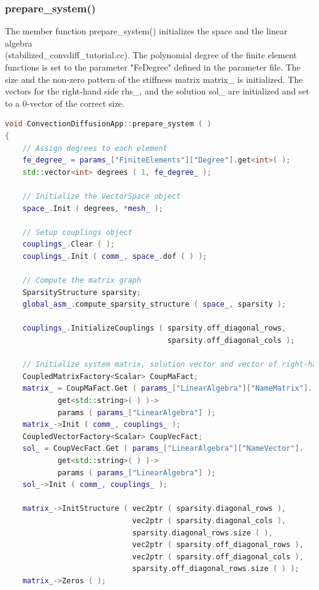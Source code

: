 \documentclass[a4paper, 11pt, twoside]{article}
\begin{document}
\subsubsection{prepare\_system()}\label{sec:prepare}
The member function prepare\_system() initializes the space and the linear algebra \\ (stabilized\_convdiff\_tutorial.cc). The polynomial degree of the finite element functions is set to the parameter "FeDegree" defined in the parameter file. The size and the non-zero pattern of the stiffness matrix matrix\_ is initialized. The vectors for the right-hand side rhs\_, and the solution sol\_ are initialized and set to a 0-vector of the correct size.
\begin{lstlisting}[language=C++, basicstyle={\footnotesize, \ttfamily}, keywordstyle=\color{blue}, numbers=none, tabsize=4]
void ConvectionDiffusionApp::prepare_system ( )
{
    // Assign degrees to each element
    fe_degree_ = params_["FiniteElements"]["Degree"].get<int>( );
    std::vector<int> degrees ( 1, fe_degree_ );

    // Initialize the VectorSpace object
    space_.Init ( degrees, *mesh_ );

    // Setup couplings object
    couplings_.Clear ( );
    couplings_.Init ( comm_, space_.dof ( ) );

    // Compute the matrix graph
    SparsityStructure sparsity;
    global_asm_.compute_sparsity_structure ( space_, sparsity );

    couplings_.InitializeCouplings ( sparsity.off_diagonal_rows,
                                     sparsity.off_diagonal_cols );

    // Initialize system matrix, solution vector and vector of right-hand side
    CoupledMatrixFactory<Scalar> CoupMaFact;
    matrix_ = CoupMaFact.Get ( params_["LinearAlgebra"]["NameMatrix"].
            get<std::string>( ) )->
            params ( params_["LinearAlgebra"] );
    matrix_->Init ( comm_, couplings_ );
    CoupledVectorFactory<Scalar> CoupVecFact;
    sol_ = CoupVecFact.Get ( params_["LinearAlgebra"]["NameVector"].
            get<std::string>( ) )->
            params ( params_["LinearAlgebra"] );
    sol_->Init ( comm_, couplings_ );

    matrix_->InitStructure ( vec2ptr ( sparsity.diagonal_rows ),
                             vec2ptr ( sparsity.diagonal_cols ),
                             sparsity.diagonal_rows.size ( ),
                             vec2ptr ( sparsity.off_diagonal_rows ),
                             vec2ptr ( sparsity.off_diagonal_cols ),
                             sparsity.off_diagonal_rows.size ( ) );
    matrix_->Zeros ( );


\end{lstlisting}
\end{document}
